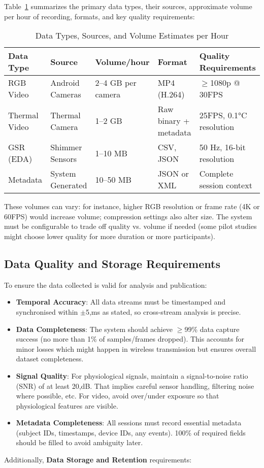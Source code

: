 \documentclass[11pt,a4paper]{report}
\begin{document}
Table~\ref{tab:data_types} summarizes the primary data types, their sources, approximate volume per hour of recording, formats, and key quality requirements: \begin{table}[h]
\centering
\caption{Data Types, Sources, and Volume Estimates per Hour}
\label{tab:data_types}
\begin{tabular}{l l l l l}
\toprule
\textbf{Data Type} & \textbf{Source} & \textbf{Volume/hour} & \textbf{Format} & \textbf{Quality Requirements} \\
\midrule
RGB Video & Android Cameras & 2--4 GB per camera & MP4 (H.264) & $\geq$1080p @ 30FPS \\
Thermal Video & Thermal Camera & 1--2 GB & Raw binary + metadata & 25FPS, 0.1°C resolution \\
GSR (EDA) & Shimmer Sensors & 1--10 MB & CSV, JSON & 50 Hz, 16-bit resolution \\
Metadata & System Generated & 10--50 MB & JSON or XML & Complete session context \\
\bottomrule
\end{tabular}
\end{table} These volumes can vary: for instance, higher RGB resolution or frame rate (4K or 60FPS) would increase volume; compression settings also alter size. The system must be configurable to trade off quality vs. volume if needed (some pilot studies might choose lower quality for more duration or more participants). \subsection{Data Quality and Storage Requirements}
To ensure the data collected is valid for analysis and publication:
\begin{itemize}
\item \textbf{Temporal Accuracy}: All data streams must be timestamped and synchronised within $\pm$5,ms as stated, so cross-stream analysis is precise.
\item \textbf{Data Completeness}: The system should achieve $\geq$99\% data capture success (no more than 1\% of samples/frames dropped). This accounts for minor losses which might happen in wireless transmission but ensures overall dataset completeness.
\item \textbf{Signal Quality}: For physiological signals, maintain a signal-to-noise ratio (SNR) of at least 20,dB. That implies careful sensor handling, filtering noise where possible, etc. For video, avoid over/under exposure so that physiological features are visible.
\item \textbf{Metadata Completeness}: All sessions must record essential metadata (subject IDs, timestamps, device IDs, any events). 100\% of required fields should be filled to avoid ambiguity later.
\end{itemize} Additionally, \textbf{Data Storage and Retention} requirements:
\end{document}
